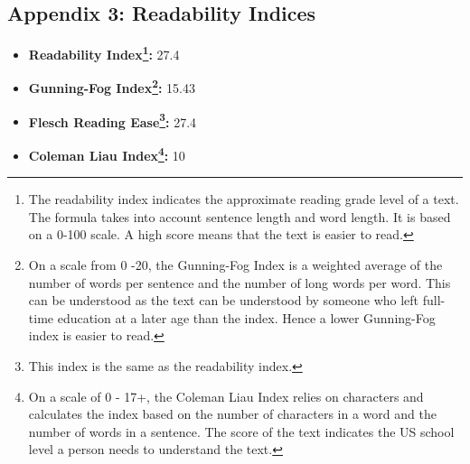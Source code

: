 \documentclass[12pt]{article} %
\begin{document}
\begin{appendices}
\section{Appendix 3: Readability Indices}
    \begin{itemize}
        \item \textbf{Readability Index\footnote{The readability index indicates the approximate reading grade level of a text. The formula takes into account sentence length and word length. It is based on a 0-100 scale. A high score means that the text is easier to read.}:} 27.4 
        \item \textbf{Gunning-Fog Index\footnote{On a scale from 0 -20, the Gunning-Fog Index is a weighted average of the number of words per sentence and the number of long words per word. This can be understood as the text can be understood by someone who left full-time education at a later age than the index. Hence a lower Gunning-Fog index is easier to read.}:} 15.43
        \item \textbf{Flesch Reading Ease\footnote{This index is the same as the readability index.}:} 27.4
        \item \textbf{Coleman Liau Index\footnote{On a scale of 0 - 17+, the Coleman Liau Index relies on characters and calculates the index based on the number of characters in a word and the number of words in a sentence. The score of the text indicates the US school level a person needs to understand the text.}:} 10  

    \end{itemize}
\end{appendices}
\newpage
\end{document}
